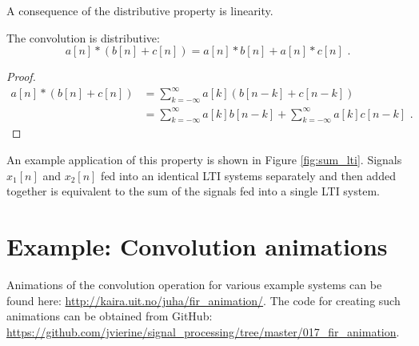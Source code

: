 \begin{marginfigure}

\begin{center}
\end{center}
\caption{A consequence of the distributive property is linearity.}
\label{fig:sum_lti}
\end{marginfigure}

The convolution is distributive:
\begin{equation}
a[n]*(b[n]+c[n]) = a[n]*b[n] + a[n]*c[n]\,\,.
\end{equation}

\begin{proof}
\begin{align}
a[n]*(b[n]+c[n]) & = \sum_{k=-\infty}^{\infty} a[k](b[n-k]+c[n-k]) \\
 & = \sum_{k=-\infty}^{\infty} a[k]b[n-k]+ \sum_{k=-\infty}^{\infty} a[k]c[n-k]\,\,.
\end{align}
\end{proof}

An example application of this property is shown in Figure
\ref{fig:sum_lti}. Signals $x_1[n]$ and $x_2[n]$ fed into an identical
LTI systems separately and then added together is equivalent to the
sum of the signals fed into a single LTI system.


\section{Example: Convolution animations}

Animations of the convolution operation for various example systems
can be found here: \url{http://kaira.uit.no/juha/fir_animation/}. The
code for creating such animations can be obtained from GitHub:
\url{https://github.com/jvierine/signal_processing/tree/master/017_fir_animation}.



